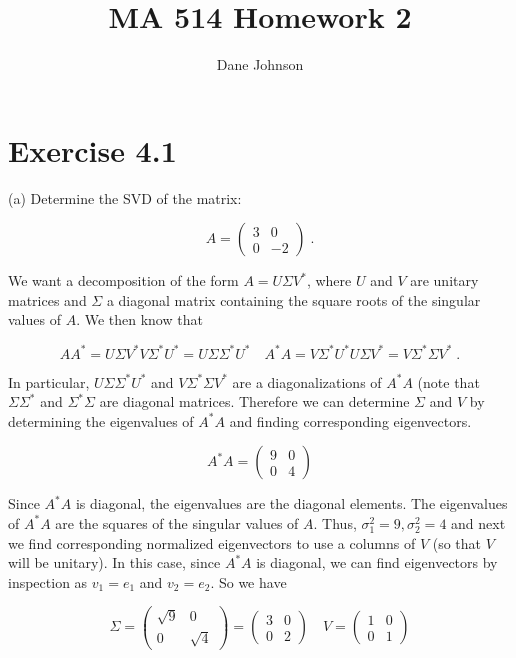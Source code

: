 \documentclass[11pt]{article}
\title{MA 514 Homework 2}
\author{Dane Johnson}
\begin{document}
\maketitle

\section*{Exercise 4.1}

(a) Determine the SVD of the matrix:

$$A = \begin{pmatrix} 3&0\\0&- 2\end{pmatrix} \;.$$

We want a decomposition of the form $A = U\Sigma V^*$, where $U$ and $V$ are unitary matrices and $\Sigma$ a diagonal matrix containing the square roots of the singular values of $A$. We then know that

$$AA^* = U\Sigma V^* V\Sigma^*U^* = U\Sigma\Sigma^*U^* \quad A^*A = V\Sigma^*U^*U \Sigma V^* = V\Sigma^* \Sigma V^* \;.$$

In particular, $U\Sigma \Sigma^* U^*$ and $V\Sigma^* \Sigma V^*$ are a diagonalizations of $A^*A$ (note that  $\Sigma \Sigma^*$ and $\Sigma^* \Sigma$ are diagonal matrices. Therefore we can determine $\Sigma$ and $V$ by determining the eigenvalues of $A^*A$ and finding corresponding eigenvectors.

$$A^*A = \begin{pmatrix} 9 & 0 \\ 0 & 4\end{pmatrix}$$

Since $A^*A$ is diagonal, the eigenvalues are the diagonal elements. The eigenvalues of $A^*A$ are the squares of the singular values of $A$. Thus, $\sigma_1^2 = 9, \sigma_2^2 = 4$ and next we find corresponding normalized eigenvectors to use a columns of $V$ (so that $V$ will be unitary). In this case, since $A^*A$ is diagonal, we can find eigenvectors by inspection as $v_1 = e_1$ and $v_2 = e_2$. So we have 

$$\Sigma = \begin{pmatrix} \sqrt{9} &0 \\ 0 & \sqrt{4}\end{pmatrix} = \begin{pmatrix} 3 &0 \\ 0 & 2 \end{pmatrix} \quad V = \begin{pmatrix}
1&0 \\ 0 &1 \end{pmatrix}$$
\end{document}
